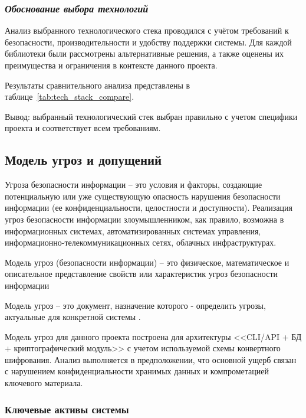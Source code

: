 \documentclass[14pt, a4paper]{extarticle}
\begin{document}
	

	\FloatBarrier
	
	\subsubsection*{\textit{Обоснование выбора технологий}}
	
	Анализ выбранного технологического стека проводился с учётом требований к безопасности, производительности и удобству поддержки системы. Для каждой библиотеки были рассмотрены альтернативные решения, а также оценены их преимущества и ограничения в контексте данного проекта.
	
	Результаты сравнительного анализа представлены в таблице~\ref{tab:tech_stack_compare}.
	
	{\fontsize{12pt}{14pt}\selectfont
	
	}
	Вывод: выбранный технологический стек выбран правильно с учетом специфики проекта и соответствует всем требованиям.
	
	\subsection{Модель угроз и допущений}
	
	Угроза безопасности информации -- это условия и факторы, создающие
	потенциальную или уже существующую опасность нарушения безопасности
	информации (ее конфиденциальности, целостности и доступности). Реализация
	угроз безопасности информации злоумышленником, как правило, возможна в
	информационных системах, автоматизированных системах управления,
	информационно-телекоммуникационных сетях, облачных инфраструктурах.
	
	Модель угроз (безопасности информации) -- это физическое,
	математическое и описательное представление свойств или характеристик угроз
	безопасности информации 
	
	Модель угроз -- это документ, назначение которого -
	определить угрозы, актуальные для конкретной системы \cite{Rayovskiy_Metody}.
	
	Модель угроз для данного проекта построена для архитектуры <<CLI/API + БД + криптографический модуль>> с учетом используемой схемы конвертного шифрования. Анализ выполняется в предположении, что основной ущерб связан с нарушением конфиденциальности хранимых данных и компрометацией ключевого материала.
	
	\subsubsection{Ключевые активы системы}
	
\end{document}
